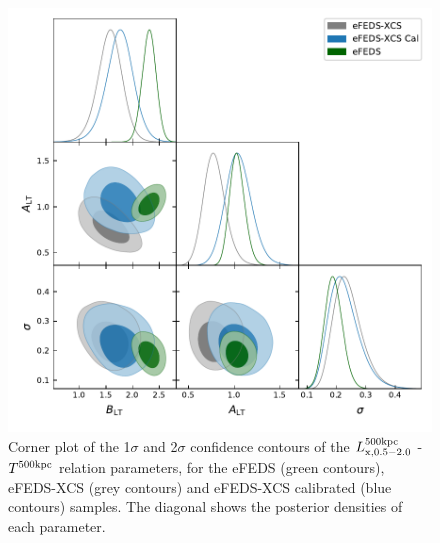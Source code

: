 \documentclass[fleqn,usenatbib]{mnras}
\begin{document}
\begin{figure}
    \centering
    \includegraphics[width=1\columnwidth]{images/lt52_corner.pdf}
    \caption[]{Corner plot of the 1$\sigma$ and 2$\sigma$ confidence contours of the $L^{500\rm{kpc}}_{\rm{x, 0.5-2.0}}$ - $T^{500\rm{kpc}}$ relation parameters, for the eFEDS (green contours), eFEDS-XCS (grey contours) and eFEDS-XCS calibrated (blue contours) samples.  The diagonal shows the posterior densities of each parameter.}
    \label{fig:ltcorner}
\end{figure}
\end{document}
